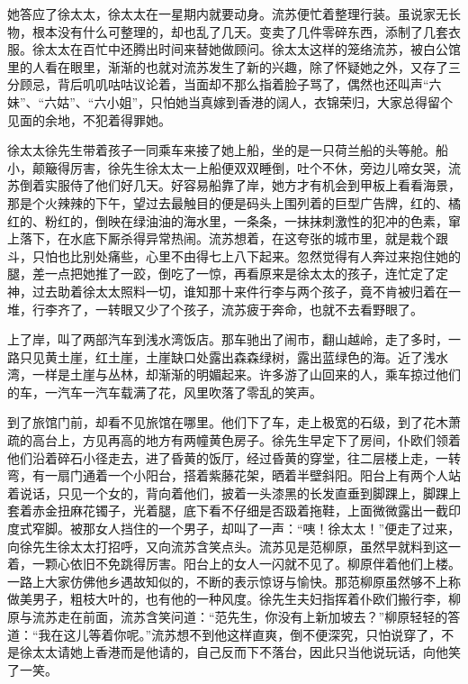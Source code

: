 \par 她答应了徐太太，徐太太在一星期内就要动身。流苏便忙着整理行装。虽说家无长物，根本没有什么可整理的，却也乱了几天。变卖了几件零碎东西，添制了几套衣服。徐太太在百忙中还腾出时间来替她做顾问。徐太太这样的笼络流苏，被白公馆里的人看在眼里，渐渐的也就对流苏发生了新的兴趣，除了怀疑她之外，又存了三分顾忌，背后叽叽咕咕议论着，当面却不那么指着脸子骂了，偶然也还叫声“六妹”、“六姑”、“六小姐”，只怕她当真嫁到香港的阔人，衣锦荣归，大家总得留个见面的余地，不犯着得罪她。
\par 徐太太徐先生带着孩子一同乘车来接了她上船，坐的是一只荷兰船的头等舱。船小，颠簸得厉害，徐先生徐太太一上船便双双睡倒，吐个不休，旁边儿啼女哭，流苏倒着实服侍了他们好几天。好容易船靠了岸，她方才有机会到甲板上看看海景，那是个火辣辣的下午，望过去最触目的便是码头上围列着的巨型广告牌，红的、橘红的、粉红的，倒映在绿油油的海水里，一条条，一抹抹刺激性的犯冲的色素，窜上落下，在水底下厮杀得异常热闹。流苏想着，在这夸张的城市里，就是栽个跟斗，只怕也比别处痛些，心里不由得七上八下起来。忽然觉得有人奔过来抱住她的腿，差一点把她推了一跤，倒吃了一惊，再看原来是徐太太的孩子，连忙定了定神，过去助着徐太太照料一切，谁知那十来件行李与两个孩子，竟不肯被归着在一堆，行李齐了，一转眼又少了个孩子，流苏疲于奔命，也就不去看野眼了。
\par 上了岸，叫了两部汽车到浅水湾饭店。那车驰出了闹市，翻山越岭，走了多时，一路只见黄土崖，红土崖，土崖缺口处露出森森绿树，露出蓝绿色的海。近了浅水湾，一样是土崖与丛林，却渐渐的明媚起来。许多游了山回来的人，乘车掠过他们的车，一汽车一汽车载满了花，风里吹落了零乱的笑声。
\par 到了旅馆门前，却看不见旅馆在哪里。他们下了车，走上极宽的石级，到了花木萧疏的高台上，方见再高的地方有两幢黄色房子。徐先生早定下了房间，仆欧们领着他们沿着碎石小径走去，进了昏黄的饭厅，经过昏黄的穿堂，往二层楼上走，一转弯，有一扇门通着一个小阳台，搭着紫藤花架，晒着半壁斜阳。阳台上有两个人站着说话，只见一个女的，背向着他们，披着一头漆黑的长发直垂到脚踝上，脚踝上套着赤金扭麻花镯子，光着腿，底下看不仔细是否趿着拖鞋，上面微微露出一截印度式窄脚。被那女人挡住的一个男子，却叫了一声：“咦！徐太太！”便走了过来，向徐先生徐太太打招呼，又向流苏含笑点头。流苏见是范柳原，虽然早就料到这一着，一颗心依旧不免跳得厉害。阳台上的女人一闪就不见了。柳原伴着他们上楼。一路上大家仿佛他乡遇故知似的，不断的表示惊讶与愉快。那范柳原虽然够不上称做美男子，粗枝大叶的，也有他的一种风度。徐先生夫妇指挥着仆欧们搬行李，柳原与流苏走在前面，流苏含笑问道：“范先生，你没有上新加坡去？”柳原轻轻的答道：“我在这儿等着你呢。”流苏想不到他这样直爽，倒不便深究，只怕说穿了，不是徐太太请她上香港而是他请的，自己反而下不落台，因此只当他说玩话，向他笑了一笑。
